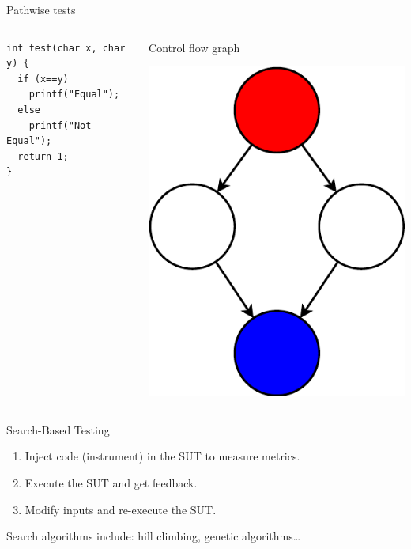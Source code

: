 \documentclass{beamer}
\begin{document}
\begin{frame}[fragile]{Pathwise tests}
  \begin{columns}
    \begin{column}{0.5\textwidth}
      \begin{verbatim}
int test(char x, char y) {
  if (x==y)
    printf("Equal");
  else
    printf("Not Equal");
  return 1;
}
      \end{verbatim}
    \end{column}
    \begin{column}{0.5\textwidth}
      Control flow graph

      \includegraphics[height=0.6\textheight]{Control_flow_graph}
    \end{column}
  \end{columns}
\end{frame}

\begin{frame}{Search-Based Testing}
  \begin{enumerate}
    \item Inject code (instrument) in the SUT to measure metrics.
    \item Execute the SUT and get feedback.
    \item Modify inputs and re-execute the SUT.
  \end{enumerate}

  Search algorithms include: hill climbing, genetic algorithms\dots
\end{frame}
\end{document}
